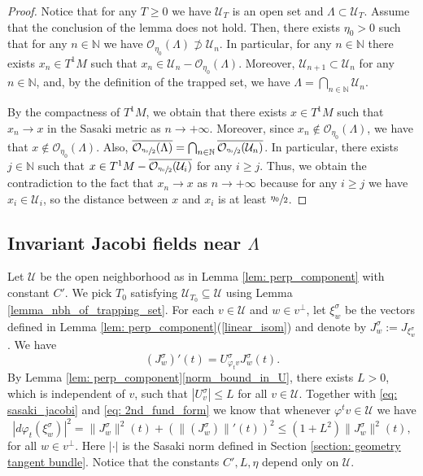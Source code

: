 \documentclass[JEP,XML,SOM,Unicode,NoFloatCountersInSection]{cedram}
\theoremstyle{definition}
\let\phi\varphi
\renewcommand{\>}{{\rangle}}
\newcommand{\<}{{\langle}}
\begin{document}
\begin{proof}
Notice that for any $T\geq 0$ we have $\mathcal U_T$ is an open set and $\Lambda\subset \mathcal U_T$. Assume that the conclusion of the lemma does not hold. Then, there exists $\eta_0>0$ such that for any $n\in\mathbb N$ we have $\mathcal O_{\eta_0}(\Lambda)\not\supset \mathcal U_n$. In particular, for any $n\in\mathbb N$ there exists $x_n\in T^1M$ such that $x_n\in \mathcal U_n - \mathcal O_{\eta_0}(\Lambda)$. Moreover, $\mathcal U_{n+1}\subset\mathcal U_{n}$ for any $n\in\mathbb N$, and, by the definition of the trapped set, we have $\Lambda=\bigcap_{n\in\mathbb N}\mathcal U_{n}$.

By the compactness of $T^1M$, we obtain that there exists $x\in T^1M$ such that $x_n\to x$ in the Sasaki metric as $n\to +\infty$. Moreover, since $x_n\notin \mathcal O_{\eta_0}(\Lambda)$, we have that $x\notin \mathcal O_{\eta_0}(\Lambda)$. Also, $\overline{\mathcal O_{\sfrac{\eta_0}{2}}(\Lambda)}=\bigcap_{n\in\mathbb N}\overline{\mathcal O_{\sfrac{\eta_0}{2}}(\mathcal U_{n})}$. In particular, there exists $j\in\mathbb N$ such that $x\in T^1M - \overline{\mathcal O_{\sfrac{\eta_0}{2}}(\mathcal U_i)}$ for any $i\geq j$. Thus, we obtain the contradiction to the fact that $x_n\to x$ as $n\to +\infty$ because for any $i\geq j$ we have $x_i\in \mathcal U_i$, so the distance between $x$ and $x_i$ is at least $\sfrac{\eta_0}{2}$.
\end{proof}

\subsection{Invariant Jacobi fields near \texorpdfstring{$\Lambda$}{La}}

Let $\mathcal{U}$ be the open neighborhood as in Lemma \ref{lem: perp_component} with constant $C'$. We pick $T_0$ satisfying $\mathcal{U}_{T_0}\subseteq \mathcal{U}$ using Lemma \ref{lemma_nbh_of_trapping_set}. For each $v\in \mathcal{U}$ and $w\in v^\perp$, let $\xi^{\sigma}_w$ be the vectors defined in Lemma \ref{lem: perp_component}(\ref{linear_isom}) and denote by $J^{\sigma}_{w}:=J_{\xi^{\sigma}_w}$. We have
\begin{equation}\label{eq: 2nd_fund_form}
(J^{\sigma}_{w})'(t)=U_{\phi_t v}^{\sigma}J^{\sigma}_{w}(t).
\end{equation}
By Lemma \ref{lem: perp_component}\eqref{norm_bound_in_U}, there exists $L\!>\!0$, which is independent of $v$, such that
$|U^\sigma_{v}|\!\leq\! L$ for all $v\in \mathcal{U}.$ Together with \eqref{eq: sasaki_jacobi} and \eqref{eq: 2nd_fund_form} we know that whenever $\phi^tv\in \mathcal{U}$ we have
\begin{equation}\label{eq: U_bound}
|d\phi_t(\xi^{\sigma}_w)|^2=\|J^{\sigma}_w\|^2(t)+\left(\|(J^{\sigma}_w)\|'(t)\right)^2\leq (1+L^2)\|J_w^{\sigma}\|^2(t),
\end{equation}
for all $w\in v^{\perp}$. Here $|{\cdot}|$ is the Sasaki norm defined in Section \ref{section: geometry tangent bundle}. Notice that the constants $C', L, \eta$ depend only on $\mathcal{U}$.
\end{document}
